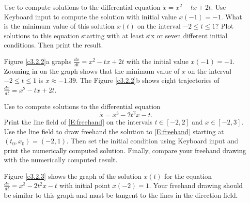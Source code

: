 \documentclass{ximera}
\begin{document}
\begin{exercise} \label{c3.2.2}
Use {\dfield} to compute solutions to the differential equation
$\dot{x} = x^2-tx+2t$. Use {\sf Keyboard input} to compute the solution
with initial value $x(-1)=-1$.  What is the minimum value of this
solution $x(t)$ on the interval $-2\leq t\leq 1$?  Plot
solutions to this equation starting with at least six or seven
different initial conditions. Then print the result.

\begin{solution}

Figure \ref{c3.2.2}a graphs $\frac{dx}{dt} = x^2 -tx +2t$ with the
initial value $x(-1) = -1$.  Zooming in on the graph shows that the
minimum value of $x$ on the interval $-2 \leq t \leq 1$ is $x \approx
-1.39$.  The Figure \ref{c3.2.2}b shows eight trajectories of
$\frac{dx}{dt} = x^2 -tx +2t$.

\begin{figure}[htb]
                       \centerline{%
                       }
\end{figure}

\end{solution}
\end{exercise}

\begin{exercise} \label{c3.2.3}
Use {\dfield} to compute solutions to the differential
equation
\begin{equation}  \label{E:freehand}
\dot{x} = x^3-2t^2x-t.
\end{equation}
Print the line field of \eqref{E:freehand} on the intervals
$t\in[-2,2]$ and $x\in[-2,3]$.  Use the line field to draw freehand
the solution to \eqref{E:freehand} starting at $(t_0,x_0)=(-2,1)$.
Then set the initial condition using {\sf Keyboard input}
and print the numerically computed solution. Finally, compare
your freehand drawing with the numerically computed result.

\begin{solution}

Figure \ref{c3.2.3} shows the graph of the solution $x(t)$ for the
equation $\frac{dx}{dt} = x^3 - 2t^2x - t$ with initial point $x(-2) = 1$.
Your freehand drawing should be similar to this graph and must be
tangent to the lines in the direction field.

\begin{figure}[htb]
                       \centerline{%
                       }
\end{figure}

\end{solution}
\end{exercise}
\end{document}

